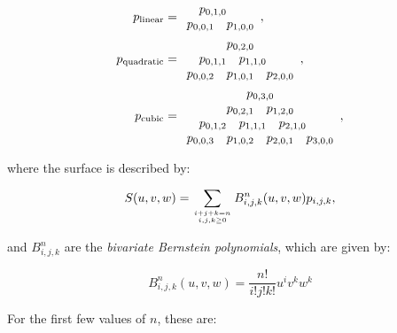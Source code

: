 \begin{align}
p_{\mathrm{linear}} &= \begin{array}{cccc}
& \multicolumn{2}{c}{p_{0,1,0}} & \\
\multicolumn{2}{c}{p_{0,0,1}} & \multicolumn{2}{c}{p_{1,0,0}}
\end{array},\\
p_{\mathrm{quadratic}} &= \begin{array}{cccccc}
\multicolumn{6}{c}{p_{0,2,0}} \\
& \multicolumn{2}{c}{p_{0,1,1}} & \multicolumn{2}{c}{p_{1,1,0}} & \\
\multicolumn{2}{c}{p_{0,0,2}} & \multicolumn{2}{c}{p_{1,0,1}} & \multicolumn{2}{c}{p_{2,0,0}}
\end{array},\\
p_{\mathrm{cubic}} &= \begin{array}{cccccccc}
\multicolumn{8}{c}{p_{0,3,0}} \\
&& \multicolumn{2}{c}{p_{0,2,1}} & \multicolumn{2}{c}{p_{1,2,0}} && \\
& \multicolumn{2}{c}{p_{0,1,2}} & \multicolumn{2}{c}{p_{1,1,1}} & \multicolumn{2}{c}{p_{2,1,0}} & \\
\multicolumn{2}{c}{p_{0,0,3}} & \multicolumn{2}{c}{p_{1,0,2}} & \multicolumn{2}{c}{p_{2,0,1}} & \multicolumn{2}{c}{p_{3,0,0}}
\end{array},
\end{align}

where the surface is described by:

\begin{equation}
S(u,v,w) = \sum_{i+j+k=n \atop i,j,k \geq 0} B^n_{i,j,k}(u,v,w) p_{i,j,k},
\end{equation}

and \(B^n_{i,j,k}\) are the \emph{bivariate Bernstein polynomials}, which are given by:

\begin{equation}
B^n_{i,j,k}(u,v,w) = \frac{n!}{i!j!k!}u^i v^k w^k
\end{equation}

For the first few values of \(n\), these are:

